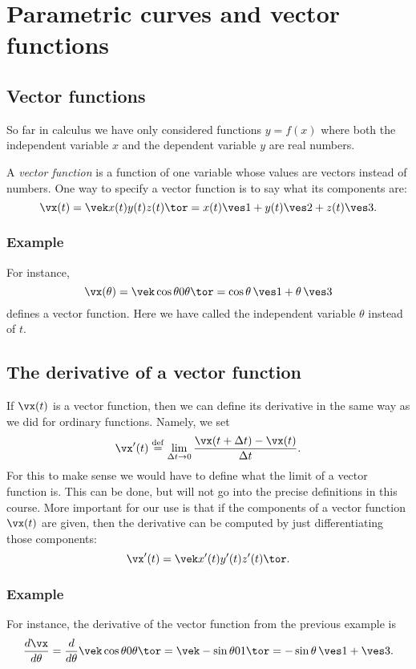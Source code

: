 \section{Parametric curves and vector functions} %
\subsection{Vector functions} %
So far in calculus we have only considered functions $y=f(x)$ where both the
independent variable $x$ and the dependent variable $y$ are real numbers.  

A \emph{vector function} is a function of one variable whose values are vectors
instead of numbers.  One way to specify a vector function is to say what its
components are:
\[
  \vx(t) = \vek x(t) \\ y(t) \\ z(t)\tor = x(t)\ves1 +y(t)\ves2 + z(t)\ves3.
\]
\subsubsection*{Example} For instance,
\[
  \vx(\theta) = \vek\cos \theta \\ 0 \\\theta\tor  = \cos\theta\,\ves1 + \theta\,\ves3
\]
defines a vector function.  Here we have called the independent variable $\theta$
instead of $t$.

\subsection{The derivative of a vector function} %
If $\vx(t)$ is a vector function, then we can define its derivative in the same way
as we did for ordinary functions. Namely, we set
\[
  \vx'(t) \stackrel{\rm def}= \lim_{\Delta t\to0} \frac{\vx(t+\Delta t) -
  \vx(t)}{\Delta t}.
\]
For this to make sense we would have to define what the limit of a vector function
is.  This can be done, but will not go into the precise definitions in this course.
More important for our use is that if the components of a vector function $\vx(t)$
are given, then the derivative can be computed by just differentiating those
components:
\begin{equation}
  \vx'(t) = \vek
  x'(t) \\ y'(t) \\z'(t)
  \tor.
  \label{eq:derivative-of-vector-function}
\end{equation}
\subsubsection*{Example} For instance, the derivative of the vector function from the
previous example is
\[
  \frac{d\vx}{d\theta} 
  =
  \frac{d}{d\theta}\vek\cos \theta \\ 0 \\\theta\tor
  =
  \vek - \sin\theta \\ 0 \\ 1 \tor  = -\sin\theta\,\ves1 + \ves3.
\]

